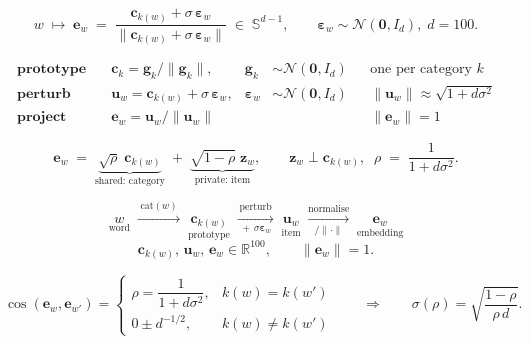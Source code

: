 %
%

\[
w \;\longmapsto\; \mathbf{e}_w \;=\;
\frac{\mathbf{c}_{k(w)} + \sigma\,\bm{\varepsilon}_w}
     {\bigl\lVert \mathbf{c}_{k(w)} + \sigma\,\bm{\varepsilon}_w \bigr\rVert}
\;\in\; \mathbb{S}^{d-1},
\qquad \bm{\varepsilon}_w \sim \mathcal{N}(\mathbf{0}, I_d),\; d = 100 .
\]

\[
\begin{aligned}
\textbf{prototype} \quad & \mathbf{c}_k = \mathbf{g}_k / \lVert \mathbf{g}_k \rVert,
  & \mathbf{g}_k &\sim \mathcal{N}(\mathbf{0}, I_d)
  && \text{one per category } k \\[2pt]
\textbf{perturb} \quad & \mathbf{u}_w = \mathbf{c}_{k(w)} + \sigma\,\bm{\varepsilon}_w,
  & \bm{\varepsilon}_w &\sim \mathcal{N}(\mathbf{0}, I_d)
  && \lVert \mathbf{u}_w \rVert \approx \sqrt{1 + d\sigma^{2}} \\[2pt]
\textbf{project} \quad & \mathbf{e}_w = \mathbf{u}_w / \lVert \mathbf{u}_w \rVert
  & &  && \lVert \mathbf{e}_w \rVert = 1
\end{aligned}
\]

\[
\mathbf{e}_w \;=\;
\underbrace{\sqrt{\rho}\;\mathbf{c}_{k(w)}}_{\text{shared: category}}
\;+\;
\underbrace{\sqrt{1-\rho}\;\mathbf{z}_w}_{\text{private: item}},
\qquad
\mathbf{z}_w \perp \mathbf{c}_{k(w)},\;\;
\rho \;=\; \frac{1}{1 + d\sigma^{2}} .
\]

\[
\underset{\textstyle\text{word}}{w}
\;\xrightarrow{\;\mathrm{cat}(w)\;}\;
\underset{\textstyle\text{prototype}}{\mathbf{c}_{k(w)}}
\;\xrightarrow[\;+\,\sigma\bm{\varepsilon}_w\;]{\text{perturb}}\;
\underset{\textstyle\text{item}}{\mathbf{u}_w}
\;\xrightarrow[\;/\lVert\cdot\rVert\;]{\text{normalise}}\;
\underset{\textstyle\text{embedding}}{\mathbf{e}_w}
\]
\[
\mathbf{c}_{k(w)},\,\mathbf{u}_w,\,\mathbf{e}_w \in \mathbb{R}^{100},
\qquad \lVert\mathbf{e}_w\rVert = 1 .
\]

\[
\cos(\mathbf{e}_w, \mathbf{e}_{w'}) =
\begin{cases}
\rho = \dfrac{1}{1 + d\sigma^{2}}, & k(w) = k(w') \\[10pt]
0 \pm d^{-1/2}, & k(w) \neq k(w')
\end{cases}
\qquad\Longrightarrow\qquad
\sigma(\rho) = \sqrt{\frac{1-\rho}{\rho\,d}} .
\]


